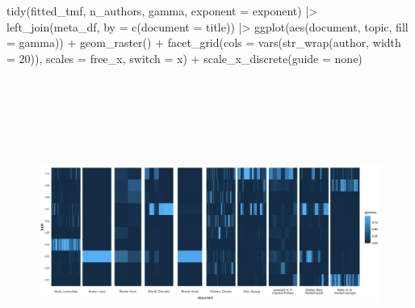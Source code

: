 \documentclass[
]{article}
\newenvironment{Shaded}{\begin{snugshade}}{\end{snugshade}}
\newcommand{\AttributeTok}[1]{\textcolor[rgb]{0.40,0.45,0.13}{#1}}
\newcommand{\DecValTok}[1]{\textcolor[rgb]{0.68,0.00,0.00}{#1}}
\newcommand{\FunctionTok}[1]{\textcolor[rgb]{0.28,0.35,0.67}{#1}}
\newcommand{\NormalTok}[1]{\textcolor[rgb]{0.00,0.23,0.31}{#1}}
\newcommand{\OtherTok}[1]{\textcolor[rgb]{0.00,0.23,0.31}{#1}}
\newcommand{\SpecialCharTok}[1]{\textcolor[rgb]{0.37,0.37,0.37}{#1}}
\newcommand{\StringTok}[1]{\textcolor[rgb]{0.13,0.47,0.30}{#1}}
\begin{document}
\begin{Shaded}
\begin{Highlighting}[]
\FunctionTok{tidy}\NormalTok{(fitted\_tmf, n\_authors, }\StringTok{\textquotesingle{}gamma\textquotesingle{}}\NormalTok{, }\AttributeTok{exponent =}\NormalTok{ exponent) }\SpecialCharTok{|\textgreater{}} 
    \FunctionTok{left\_join}\NormalTok{(meta\_df, }\AttributeTok{by =} \FunctionTok{c}\NormalTok{(}\StringTok{\textquotesingle{}document\textquotesingle{}} \OtherTok{=} \StringTok{\textquotesingle{}title\textquotesingle{}}\NormalTok{)) }\SpecialCharTok{|\textgreater{}} 
    \FunctionTok{ggplot}\NormalTok{(}\FunctionTok{aes}\NormalTok{(document, topic, }\AttributeTok{fill =}\NormalTok{ gamma)) }\SpecialCharTok{+}
    \FunctionTok{geom\_raster}\NormalTok{() }\SpecialCharTok{+}
    \FunctionTok{facet\_grid}\NormalTok{(}\AttributeTok{cols =} \FunctionTok{vars}\NormalTok{(}\FunctionTok{str\_wrap}\NormalTok{(author, }
                                    \AttributeTok{width =} \DecValTok{20}\NormalTok{)), }
               \AttributeTok{scales =} \StringTok{\textquotesingle{}free\_x\textquotesingle{}}\NormalTok{, }
               \AttributeTok{switch =} \StringTok{\textquotesingle{}x\textquotesingle{}}\NormalTok{) }\SpecialCharTok{+}
    \FunctionTok{scale\_x\_discrete}\NormalTok{(}\AttributeTok{guide =} \StringTok{\textquotesingle{}none\textquotesingle{}}\NormalTok{)}
\end{Highlighting}
\end{Shaded}

\begin{figure}[H]

{\centering \includegraphics[width=6in,height=4in]{paper_files/figure-pdf/unnamed-chunk-50-1.pdf}

}

\end{figure}
\end{document}
